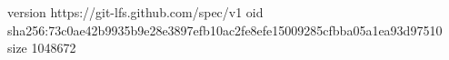 version https://git-lfs.github.com/spec/v1
oid sha256:73c0ae42b9935b9e28e3897efb10ac2fe8efe15009285cfbba05a1ea93d97510
size 1048672
